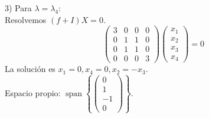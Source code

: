 \begin{solution}
3)   Para $\lambda=\lambda_{4}$: \\
Resolvemos \((f + I)X = 0\).
\[
     \begin{pmatrix}
     3 & 0 & 0 & 0 \\
     0 & 1 & 1 & 0 \\
     0 & 1 & 1 & 0 \\
     0 & 0 & 0 & 3
     \end{pmatrix}
     \begin{pmatrix}
     x_1 \\
     x_2 \\
     x_3 \\
     x_4
     \end{pmatrix}
     = 0
     \]
La solución es \( x_1 = 0, x_4 = 0, x_2 = -x_3 \). \\
Espacio propio: \(\operatorname{span}\left\{\begin{pmatrix} 0 \\ 1 \\ -1 \\ 0 \end{pmatrix}\right\}\).
\end{solution}